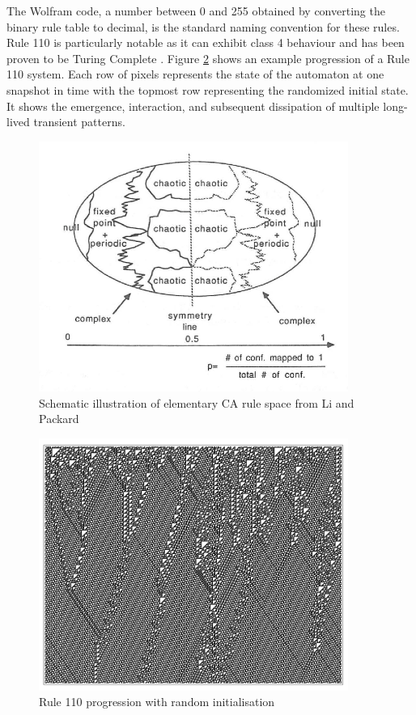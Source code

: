 The Wolfram code, a number between 0 and 255 obtained by converting the binary rule table to decimal, is the standard naming convention for these rules. Rule 110 is particularly notable as it can exhibit class 4 behaviour \cite{wolfram2002} and has been proven to be Turing Complete \cite{cook2004universality}. Figure \ref{fig:rule-110} shows an example progression of a Rule 110 system. Each row of pixels represents the state of the automaton at one snapshot in time with the topmost row representing the randomized initial state. It shows the emergence, interaction, and subsequent dissipation of multiple long-lived transient patterns.

\begin{figure}[!h]
\centering
\includegraphics[width=0.9\textwidth]{preliminaries/rule-space.png}
\caption{Schematic illustration of elementary CA rule space from Li and Packard \cite{li1990structure}}
\label{fig:rule-space}
\end{figure}

\begin{figure}[!h]
\centering
\includegraphics[width=0.9\textwidth]{preliminaries/rule-110.png}
\caption{Rule 110 progression with random initialisation \cite{wolfram2002}}
\label{fig:rule-110}
\end{figure}

